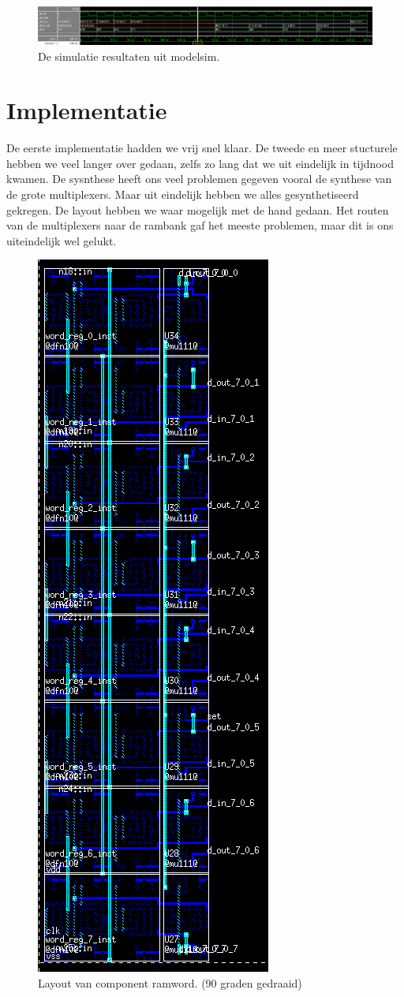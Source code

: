\documentclass{scrartcl}  %
\begin{document}
\begin{figure}[H]
\centering
		\includegraphics[width=\textwidth]{resource/modelsimsim}
		\caption{De simulatie resultaten uit modelsim.}
		\label{fig:modelsim-ram}
\end{figure}

\section{Implementatie}
De eerste implementatie hadden we vrij snel klaar. De tweede en meer stucturele hebben we veel langer over gedaan, zelfs zo lang dat we uit eindelijk in tijdnood kwamen. De sysnthese heeft ons veel problemen gegeven vooral de synthese van de grote multiplexers. Maar uit eindelijk hebben we alles gesynthetiseerd gekregen. De layout hebben we waar mogelijk met de hand gedaan. Het routen van de multiplexers naar de rambank gaf het meeste problemen, maar dit is ons uiteindelijk wel gelukt.
\begin{figure}[H]
\centering
		\includegraphics[height=\textwidth, angle=90]{resource/ramword}
		\caption{Layout van component ramword. (90 graden gedraaid)}
		\label{fig:layout-ramword}
\end{figure}
\end{document}
